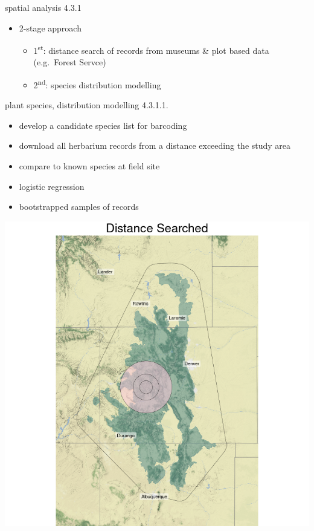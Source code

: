 \documentclass[
  ignorenonframetext,
]{beamer}
\providecommand{\tightlist}{%
  \setlength{\itemsep}{0pt}\setlength{\parskip}{0pt}}
\begin{document}
\begin{frame}{spatial analysis 4.3.1}
\protect\hypertarget{spatial-analysis-4.3.1}{}
\begin{itemize}
\tightlist
\item
  2-stage approach

  \begin{itemize}
  \tightlist
  \item
    1\textsuperscript{st}: distance search of records from museums \&
    plot based data (e.g.~Forest Servce)
  \item
    2\textsuperscript{nd}: species distribution modelling
  \end{itemize}
\end{itemize}
\end{frame}

\begin{frame}{plant species, distribution modelling 4.3.1.1.}
\protect\hypertarget{plant-species-distribution-modelling-4.3.1.1.}{}
\begin{itemize}
\tightlist
\item
  develop a candidate species list for barcoding\\
\item
  download all herbarium records from a distance exceeding the study
  area
\item
  compare to known species at field site
\item
  logistic regression
\item
  bootstrapped samples of records
\end{itemize}

\includegraphics[width=1.05\textwidth,height=\textheight]{../graphics/plots/distance_queried.png}

\note{}
\end{frame}
\end{document}
